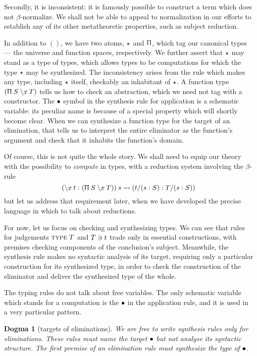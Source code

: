 \documentclass{jfp1}
\newtheorem{dogma}[theorem]{Dogma}
\begin{document}
Secondly, it is inconsistent: it is famously possible to construct a term
which does not $\beta$-normalize. We shall not be able to appeal to normalization
in our efforts to establish any of its other metatheoretic properties, such as
subject reduction.

In addition to $()$, we have two atoms, $\star$ and $\Uppi$, which tag our canonical
types --- the universe and function spaces, respectively. We further assert that
$\star$ may stand as a type of types, which allows types to be computations for which
the type $\star$ may be synthesized. The inconsistency arises from the rule which
makes any type, including $\star$ itself, checkably an inhabitant of $\star$. A
function type $(\Uppi\:S\;\backslash x\:{T})$ tells us how to check an abstraction, which we need not
tag with a constructor. The $\bullet$ symbol in the synthesis rule for application
is a schematic variable: its peculiar name is because of a special property which
will shortly become clear. When we can synthesize a function type for the target
of an elimination, that tells us to interpret the entire eliminator as the function's
argument and check that it inhabits the function's domain.

Of course, this is not quite the whole story. We shall need to equip our theory
with the possibility to \emph{compute} in types, with a reduction system involving
the $\beta$-rule
\[
  (\backslash x\:t : (\Uppi\:S\;\backslash x\:{T}))\:s \rightsquigarrow (t/(s:S):T/(s:S))
\]
but let us address that requirement later, when we have developed the precise
language in which to talk about reductions.

For now, let us focus on checking and synthesizing types. We can see that
rules for judgements $\textsc{type}\;T$ and $T \ni t$ trade only in essential constructions,
with premises checking components of the conclusion's subject. Meanwhile, the synthesis
rule makes no syntactic analysis of its target, requiring only a particular construction
for its synthesized type, in order to check the construction of the eliminator
and deliver the synthesized type of the whole.

The typing rules do not talk about free variables. The only schematic variable
which stands for a computation is the $\bullet$ in the application rule, and it is used in a
very particular pattern.

\begin{dogma}[targets of eliminations]
  We are free to write synthesis rules only for eliminations. These rules must
  name the target $\bullet$ but not analyse its syntactic structure. The first premise
  of an elimination rule must synthesize the type of $\bullet$.
\end{dogma}
\end{document}

